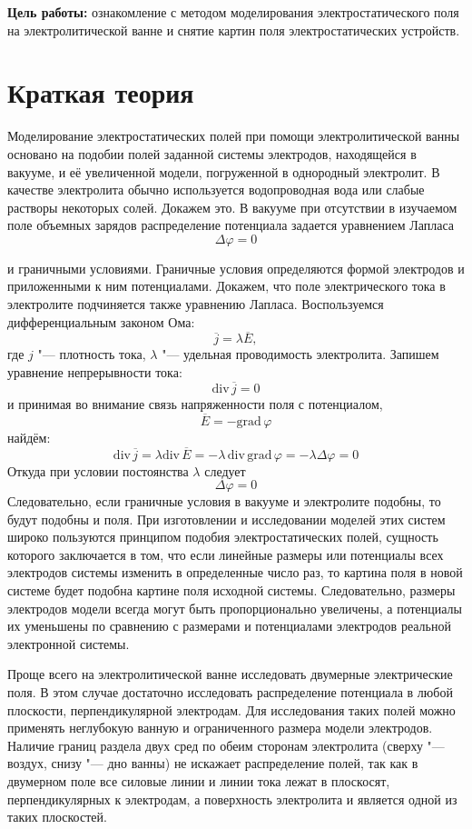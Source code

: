 \textbf{Цель работы: } ознакомление с методом моделирования электростатического поля на электролитической ванне и снятие картин поля электростатических устройств.

\section*{Краткая теория}

Моделирование электростатических полей при помощи электролитической ванны основано на подобии полей заданной системы электродов, находящейся в вакууме, и её увеличенной модели, погруженной в однородный электролит. В качестве электролита обычно используется водопроводная вода или слабые растворы некоторых солей. Докажем это. В вакууме при отсутствии в изучаемом поле объемных зарядов распределение потенциала задается уравнением Лапласа
$$
  \Delta \varphi = 0
$$

 и граничными условиями. Граничные условия определяются формой электродов и приложенными к ним потенциалами. Докажем, что поле электрического тока в электролите подчиняется также уравнению Лапласа.
 Воспользуемся дифференциальным законом Ома:
 $$
  \overline{j} = \lambda \overline{E},
 $$
где $j$ "--- плотность тока, $\lambda$ "--- удельная проводимость электролита. Запишем уравнение непрерывности тока:
$$
  \textrm{div} \,\overline{j} = 0
$$
и принимая во внимание связь напряженности поля с потенциалом,
$$
  \overline{E} = -\textrm{grad} \,\varphi
$$
найдём:
$$
\mathrm{div}\,\overline{j} = \lambda \mathrm{div}\,\overline{E} = -\lambda\, \mathrm{div} \, \mathrm{grad} \, \varphi = -\lambda \Delta \varphi = 0
$$
Откуда при условии постоянства $\lambda$ следует
$$
\Delta\varphi = 0
$$
Следовательно, если граничные условия в вакууме и электролите подобны, то будут подобны и поля.
При изготовлении и исследовании моделей этих систем широко пользуются принципом подобия электростатических полей, сущность которого заключается в том, что если линейные размеры или потенциалы всех электродов системы изменить в определенные число раз, то картина поля в новой системе будет подобна картине поля исходной системы. Следовательно, размеры электродов модели всегда могут быть пропорционально увеличены, а потенциалы их уменьшены по сравнению с размерами и потенциалами электродов реальной электронной системы.

Проще всего на электролитической ванне исследовать двумерные электрические поля. В этом случае достаточно исследовать распределение потенциала в любой плоскости, перпендикулярной электродам. Для исследования таких полей можно применять неглубокую ванную и ограниченного размера модели электродов. Наличие границ раздела двух сред по обеим сторонам электролита (сверху "--- воздух, снизу "--- дно ванны) не искажает распределение полей, так как в двумерном поле все силовые линии и линии тока лежат в плоскосят, перпендикулярных к электродам, а поверхность электролита и является одной из таких плоскостей.

